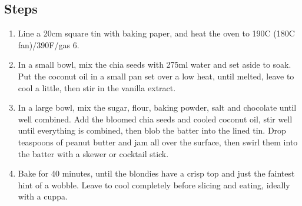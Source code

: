 \documentclass{book}
\begin{document}
\subsection*{Steps}
\begin{enumerate}
\item Line a 20cm square tin with baking paper, and heat the oven to 190C (180C fan)/390F/gas 6.
\item In a small bowl, mix the chia seeds with 275ml water and set aside to soak. Put the coconut oil in a small pan set over a low heat, until melted, leave to cool a little, then stir in the vanilla extract.
\item In a large bowl, mix the sugar, flour, baking powder, salt and chocolate until well combined. Add the bloomed chia seeds and cooled coconut oil, stir well until everything is combined, then blob the batter into the lined tin. Drop teaspoons of peanut butter and jam all over the surface, then swirl them into the batter with a skewer or cocktail stick.
\item Bake for 40 minutes, until the blondies have a crisp top and just the faintest hint of a wobble. Leave to cool completely before slicing and eating, ideally with a cuppa.
\end{enumerate}
\newpage
\end{document}
